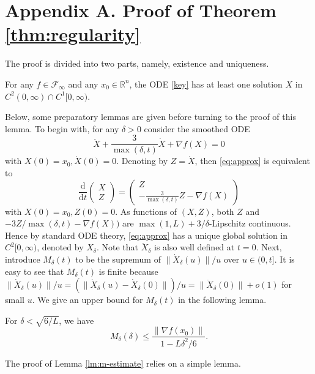 \documentclass[twoside,11pt]{article}
\newcommand{\der}[1]{\dot #1}
\newcommand{\dder}[1]{\ddot #1}
\newcommand{\norm}[1]{\|#1\|}
\newcommand{\R}{\mathbb{R}}
\renewcommand{\d}{{\mathrm{d}}}
\begin{document}
\section*{Appendix A. Proof of Theorem \ref{thm:regularity}}
\label{app:a}
The proof is divided into two parts, namely, existence and uniqueness.
\begin{lemma}\label{lm:exist}
For any $f\in\mathcal{F}_{\infty}$ and any $x_0\in\R^n$, the ODE \eqref{key} has at least one solution $X$ in $C^{2}(0,\infty)\cap C^{1}[0,\infty)$. 
\end{lemma}
Below, some preparatory lemmas are given before turning to the proof of this lemma. To begin with, for any $\delta > 0$ consider the smoothed ODE
\begin{equation}\label{eq:approx}
\dder{X} + \frac{3}{\max(\delta, t)}\der{X} + \nabla f(X) = 0
\end{equation}
with $X(0) = x_0, \der{X(0)} = 0$. Denoting by $Z = \der{X}$, then \eqref{eq:approx} is equivalent to
\begin{equation}\nonumber
\frac{\d}{\d t}
\begin{pmatrix}
X\\
Z
\end{pmatrix}
=
\begin{pmatrix}
Z\\
-\frac{3}{\max(\delta, t)}Z - \nabla f(X) 
\end{pmatrix}
\end{equation}
with $X(0) = x_0, Z(0) = 0$. As functions of $(X, Z)$, both $Z$ and $-3Z/\max(\delta, t) - \nabla f(X))$ are $\max(1, L) + 3/\delta$-Lipschitz continuous. Hence by standard ODE theory, \eqref{eq:approx} has a unique global solution in $C^{2}[0,\infty)$, denoted by $X_{\delta}$. Note that $\dder{X_{\delta}}$ is also well defined at $t=0$. Next, introduce $M_{\delta}(t)$ to be the supremum of $\norm{\der{X}_{\delta}(u)}/u$ over $u\in (0, t]$. It is easy to see that $M_{\delta}(t)$ is finite because $\norm{\der{X}_{\delta}(u)}/u = (\norm{\der{X}_{\delta}(u) - \der{X}_{\delta}(0)})/u = \norm{\dder{X_{\delta}}(0)} + o(1)$ for small $u$. We give an upper bound for $M_{\delta}(t)$ in the following lemma.
\begin{lemma}\label{lm:m-estimate}
For $\delta < \sqrt{6/L}$, we have
\begin{equation}\nonumber
M_{\delta}(\delta) \le \frac{\norm{\nabla f(x_0)}}{1 - L\delta^2/6}.
\end{equation}
\end{lemma}
The proof of Lemma \ref{lm:m-estimate} relies on a simple lemma.
\end{document}
